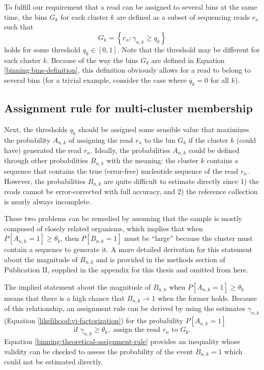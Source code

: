 \documentclass[officiallayout]{tktla}
\begin{document}
To fulfill our requirement that a read can be assigned to several bins
at the same time, the bins $G_{k}$ for each cluster $k$ are defined as
a subset of sequencing reads $r_{n}$ such that
\begin{equation}
  \label{binning:bins-definition}
  G_{k} = \left\{r_{n} : \gamma_{n, k} \geq q_{k}\right\}
\end{equation}
holds for some threshold $q_{k} \in \left[0, 1\right]$. Note that the
threshold may be different for each cluster $k$. Because of the way
the bins $G_{k}$ are defined in Equation
\eqref{binning:bins-definition}, this definition obviously allows for
a read to belong to several bins (for a trivial example, consider
the case where $q_{k} = 0$ for all $k$).

\subsection{Assignment rule for multi-cluster membership}

Next, the thresholds $q_{k}$ should be assigned some sensible value
that maximizes the probability $A_{n, k}$ of assigning the read
$r_{n}$ to the bin $G_{k}$ if the cluster $k$ (could have) generated
the read $r_{n}$. Ideally, the probabilities $A_{n, k}$ could be
defined through other probabilities $B_{n, k}$ with the meaning: the
cluster $k$ contains a sequence that contains the true (error-free)
nucleotide sequence of the read $r_{n}$. However, the probabilities
$B_{n, k}$ are quite difficult to estimate directly since 1) the reads
cannot be error-corrected with full accuracy, and 2) the reference
collection is nearly always incomplete.

These two problems can be remedied by assuming that the sample is
mostly composed of closely related organisms, which implies that when
$P\left[A_{n, k} = 1\right] \geq \theta_{k}$, then $P\left[B_{n, k} =
  1\right]$ must be ``large'' because the cluster must contain a
sequence to generate it. A more detailed derivation for this statement
about the magnitude of $B_{n, k}$ and is provided in the methods
section of Publication II, supplied in the appendix for this thesis
and omitted from here.

The implied statement about the magnitude of $B_{n, k}$ when
$P\left[A_{n, k} = 1\right] \geq \theta_{k}$ means that there is a
high chance that $B_{n, k} \rightarrow 1$ when the former
holds. Because of this relationship, an assignment rule can be derived
by using the estimates $\gamma_{n, k}$ (Equation
\eqref{likelihood:vi-factorization}) for the probability $P\left[A_{n,
    k} = 1\right]$
\begin{equation}
  \label{binning:theoretical-assignment-rule}
  \text{if } \gamma_{n, k} \geq \theta_{k}, \text{ assign the read } r_{n} \text{ to } G_{k}.
\end{equation}
Equation \eqref{binning:theoretical-assignment-rule} provides an
inequality whose validity can be checked to assess the probability of
the event $B_{n, k} = 1$ which could not be estimated directly.
\end{document}
